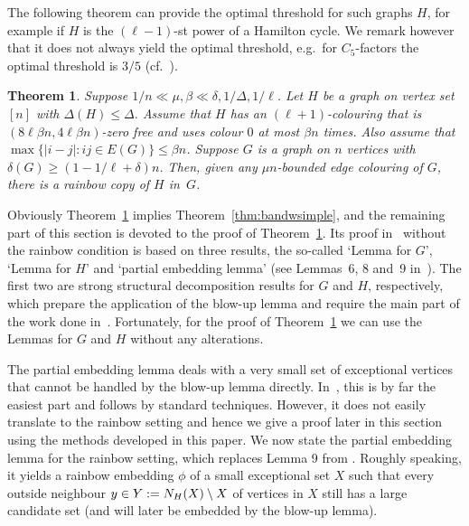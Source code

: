 \documentclass[10pt]{amsart}
\newtheorem{theorem}[algorithm]{Theorem}
\theoremstyle{definition}
\theoremstyle{claimstyle}
\theoremstyle{stepstyle}
\numberwithin{equation}{section}
\begin{document}
The following theorem can provide the optimal threshold for such graphs $H$, for example if $H$ is the $(\ell-1)$-st power of a Hamilton cycle. We remark however that it does not always yield the optimal threshold, e.g.~for $C_5$-factors the optimal threshold is $3/5$ (cf.~\cite{KO:09}).
\begin{theorem}\label{thm:bandwidth}
Suppose $1/n\ll \mu , \beta \ll \delta,1/\Delta,1/\ell$.
Let $H$ be a graph on vertex set $[n]$ with $\Delta(H)\leq \Delta$. Assume that $H$ has an $(\ell+1)$-colouring that is $(8\ell \beta n,4\ell \beta n)$-zero free
and uses colour $0$ at most $\beta n$ times. Also assume that $\max \{|i-j|\colon ij\in E(G)\}\le \beta n$.
Suppose $G$ is a graph on $n$ vertices with $\delta(G)\geq (1-1/\ell+\delta)n$. Then, given any $\mu n$-bounded edge colouring of $G$, there is a rainbow copy of $H$ in~$G$.
\end{theorem}

Obviously Theorem~\ref{thm:bandwidth} implies Theorem~\ref{thm:bandwsimple}, and the remaining part of this section is devoted to the proof of Theorem~\ref{thm:bandwidth}. Its proof in~\cite{BST:09} without the rainbow condition is based on three results, the so-called `Lemma for $G$', `Lemma for $H$' and `partial embedding lemma' (see Lemmas~6, 8 and~9 in~\cite{BST:09}). The first two are strong structural decomposition results for $G$ and $H$, respectively,
which prepare the application of the blow-up lemma and require the main part of the work done in~\cite{BST:09}.
Fortunately, for the proof of Theorem~\ref{thm:bandwidth} we can use the Lemmas for $G$ and $H$ without any alterations.

The partial embedding lemma deals with a very small set of exceptional vertices that cannot be handled by the blow-up lemma directly.
In~\cite{BST:09}, this is by far the easiest part and follows by standard techniques.
However, it does not easily translate to the rainbow setting and hence we give a proof later in this section using the methods developed in this paper.
We now state the partial embedding lemma for the rainbow setting, which replaces Lemma 9 from \cite{BST:09}.
Roughly speaking, it yields a rainbow embedding $\phi$ of a small exceptional set $X$ such that every outside neighbour $y\in Y:=N_H(X)\setminus X$ of vertices in $X$ still has a large candidate set (and will later be embedded by the blow-up lemma).
\end{document}
